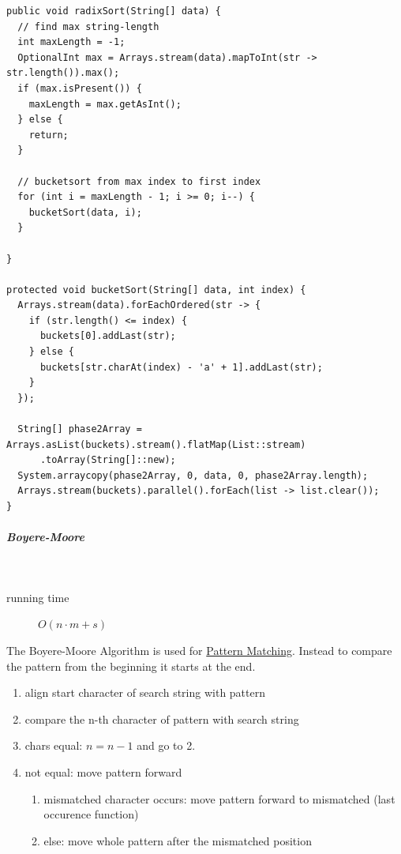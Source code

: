 \documentclass[11pt,twoside,twocolumn,landscape]{article}
\begin{document}
\lstset{language=java,label= ,caption= ,captionpos=b,numbers=none}
\begin{lstlisting}
public void radixSort(String[] data) {
  // find max string-length
  int maxLength = -1;
  OptionalInt max = Arrays.stream(data).mapToInt(str -> str.length()).max();
  if (max.isPresent()) {
    maxLength = max.getAsInt();
  } else {
    return;
  }

  // bucketsort from max index to first index
  for (int i = maxLength - 1; i >= 0; i--) {
    bucketSort(data, i);
  }

}

protected void bucketSort(String[] data, int index) {
  Arrays.stream(data).forEachOrdered(str -> {
    if (str.length() <= index) {
      buckets[0].addLast(str);
    } else {
      buckets[str.charAt(index) - 'a' + 1].addLast(str);
    }
  });

  String[] phase2Array = Arrays.asList(buckets).stream().flatMap(List::stream)
      .toArray(String[]::new);
  System.arraycopy(phase2Array, 0, data, 0, phase2Array.length);
  Arrays.stream(buckets).parallel().forEach(list -> list.clear());
}
\end{lstlisting}

\subparagraph{Boyere-Moore} \
\label{sec:orgaa1016a}

\begin{description}
\item[{running time}] \(O(n\cdot m + s)\)
\end{description}

The Boyere-Moore Algorithm is used for \href{../../../roam/20211215163350-pattern_matching.org}{Pattern Matching}.
Instead to compare the pattern from the beginning it starts at the end.

\begin{enumerate}
\item align start character of search string with pattern
\item compare the n-th character of pattern with search string
\item chars equal: \(n = n-1\) and go to 2.
\item not equal: move pattern forward
\begin{enumerate}
\item mismatched character occurs: move pattern forward to mismatched (last occurence function)
\item else: move whole pattern after the mismatched position
\end{enumerate}
\end{enumerate}
\end{document}
